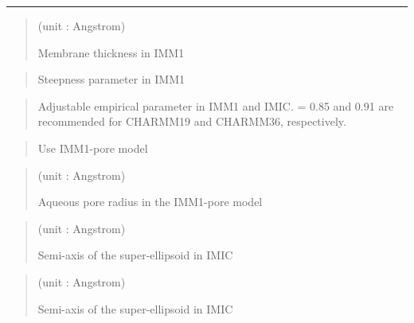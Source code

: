 \documentclass[a4paper,11pt,oneside,english]{sphinxmanual}
\begin{document}
\bigskip\hrule\bigskip


 
\begin{quote}

 (unit : Angstrom)

Membrane thickness  in IMM1
\end{quote}

 
\begin{quote}


Steepness parameter  in IMM1
\end{quote}

 
\begin{quote}


Adjustable empirical parameter  in IMM1 and IMIC.
 = 0.85 and 0.91 are recommended for CHARMM19 and CHARMM36, respectively.
\end{quote}

\begin{quote}


Use IMM1-pore model 
\end{quote}

 
\begin{quote}

 (unit : Angstrom)

Aqueous pore radius in the IMM1-pore model
\end{quote}

 
\begin{quote}

 (unit : Angstrom)

Semi-axis  of the super-ellipsoid in IMIC
\end{quote}

 
\begin{quote}

 (unit : Angstrom)

Semi-axis  of the super-ellipsoid in IMIC
\end{quote}
\end{document}
